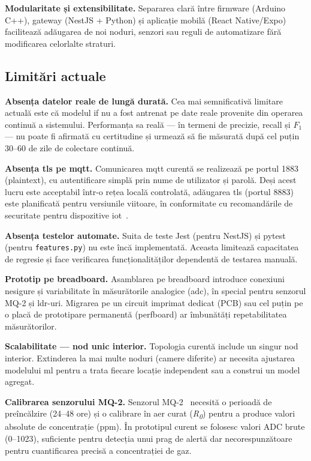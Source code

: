 \textbf{Modularitate și extensibilitate.}
Separarea clară între firmware (Arduino C++), gateway (NestJS + Python) și aplicație mobilă
(React Native/Expo) facilitează adăugarea de noi noduri, senzori sau reguli de automatizare fără
modificarea celorlalte straturi.

\subsection{Limitări actuale}

\textbf{Absența datelor reale de lungă durată.}
Cea mai semnificativă limitare actuală este că modelul \gls{if} nu a fost antrenat pe date
reale provenite din operarea continuă a sistemului. Performanța sa reală — în termeni de
precizie, recall și $F_1$ — nu poate fi afirmată cu certitudine și urmează să fie măsurată
după cel puțin 30–60 de zile de colectare continuă.

\textbf{Absența \gls{tls} pe \gls{mqtt}.}
Comunicarea \gls{mqtt} curentă se realizează pe portul 1883 (plaintext), cu autentificare
simplă prin nume de utilizator și parolă. Deși acest lucru este acceptabil într-o rețea locală
controlată, adăugarea \gls{tls} (portul 8883) este planificată pentru versiunile viitoare,
în conformitate cu recomandările de securitate pentru dispozitive \gls{iot}~\cite{alrawi2019sokhome}.

\textbf{Absența testelor automate.}
Suita de teste Jest (pentru NestJS) și pytest (pentru \texttt{features.py}) nu este încă
implementată. Aceasta limitează capacitatea de regresie și face verificarea funcționalităților
dependentă de testarea manuală.

\textbf{Prototip pe breadboard.}
Asamblarea pe breadboard introduce conexiuni nesigure și variabilitate în măsurătorile analogice
(\gls{adc}), în special pentru senzorul MQ-2 și \gls{ldr}-uri. Migrarea pe un circuit imprimat
dedicat (PCB) sau cel puțin pe o placă de prototipare permanentă (perfboard) ar îmbunătăți
repetabilitatea măsurătorilor.

\textbf{Scalabilitate — nod unic interior.}
Topologia curentă include un singur nod interior. Extinderea la mai multe noduri (camere
diferite) ar necesita ajustarea modelului \gls{ml} pentru a trata fiecare locație independent
sau a construi un model agregat.

\textbf{Calibrarea senzorului MQ-2.}
Senzorul MQ-2~\cite{hanwei2020mq2} necesită o perioadă de preîncălzire (24–48 ore) și o
calibrare în aer curat (\textit{R\textsubscript{0}}) pentru a produce valori absolute de
concentrație (ppm). În prototipul curent se folosesc valori ADC brute (0–1023), suficiente
pentru detecția unui prag de alertă dar necorespunzătoare pentru cuantificarea precisă a
concentrației de gaz.

